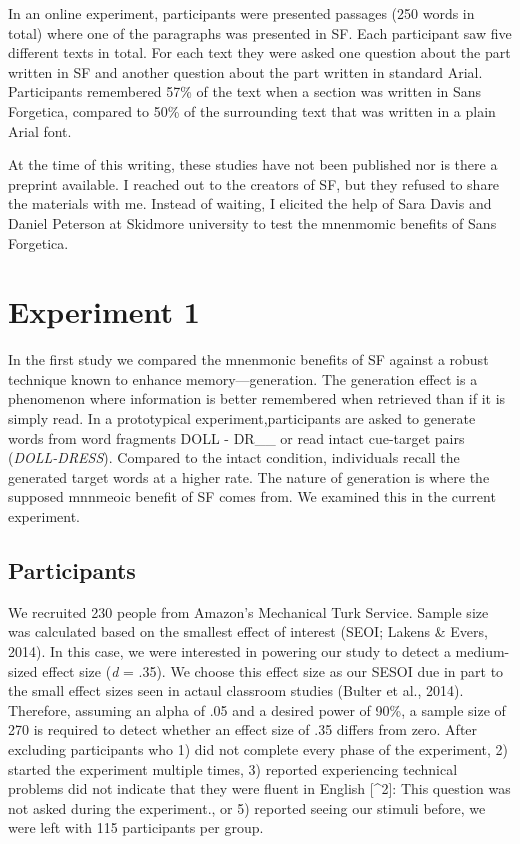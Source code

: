 \documentclass[doc]{apa6}
\begin{document}
In an online experiment, participants were presented passages (250 words in total) where one of the paragraphs was presented in SF. Each participant saw five different texts in total. For each text they were asked one question about the part written in SF and another question about the part written in standard Arial. Participants remembered 57\% of the text when a section was written in Sans Forgetica, compared to 50\% of the surrounding text that was written in a plain Arial font.

At the time of this writing, these studies have not been published nor is there a preprint available. I reached out to the creators of SF, but they refused to share the materials with me. Instead of waiting, I elicited the help of Sara Davis and Daniel Peterson at Skidmore university to test the mnenmomic benefits of Sans Forgetica.

\hypertarget{experiment-1}{%
\section{Experiment 1}\label{experiment-1}}

In the first study we compared the mnenmonic benefits of SF against a robust technique known to enhance memory---generation. The generation effect is a phenomenon where information is better remembered when retrieved than if it is simply read. In a prototypical experiment,participants are asked to generate words from word fragments DOLL - DR\_\_ or read intact cue-target pairs (\emph{DOLL-DRESS}). Compared to the intact condition, individuals recall the generated target words at a higher rate. The nature of generation is where the supposed mnnmeoic benefit of SF comes from. We examined this in the current experiment.

\hypertarget{participants}{%
\subsection{Participants}\label{participants}}

We recruited 230 people from Amazon's Mechanical Turk Service. Sample size was calculated based on the smallest effect of interest (SEOI; Lakens \& Evers, 2014). In this case, we were interested in powering our study to detect a medium-sized effect size (\emph{d} = .35). We choose this effect size as our SESOI due in part to the small effect sizes seen in actaul classroom studies (Bulter et al., 2014). Therefore, assuming an alpha of .05 and a desired power of 90\%, a sample size of 270 is required to detect whether an effect size of .35 differs from zero. After excluding participants who 1) did not complete every phase of the experiment, 2) started the experiment multiple times, 3) reported experiencing technical problems did not indicate that they were fluent in English {[}\^{}2{]}: This question was not asked during the experiment., or 5) reported seeing our stimuli before, we were left with 115 participants per group.
\end{document}
